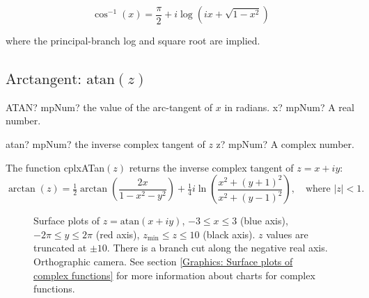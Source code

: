 \begin{equation}
	\cos^{-1}(x) = \frac{\pi}{2}+i \log \left(ix + \sqrt{1-x^2} \right) 
\end{equation}

where the principal-branch log and square root are implied.



\newpage
\subsection{\texorpdfstring{$\text{Arctangent: atan}(z)$}{atan}}
\label{inverse complex tangent}

\begin{mpFunctionsExtract}
	\mpWorksheetFunctionOneNotImplemented
	{ATAN? mpNum? the value of the arc-tangent of $x$ in radians.}
	{x? mpNum? A real number.}
\end{mpFunctionsExtract}

\vspace{0.6cm}


\begin{mpFunctionsExtract}
	\mpFunctionOne
	{atan? mpNum? the inverse complex tangent of $z$}
	{z? mpNum? A complex number.}
\end{mpFunctionsExtract}

\vspace{0.3cm}
The function \textsf{cplxATan$(z)$} returns the inverse complex tangent of $z=x+iy$: 
\begin{equation}
	\arctan(z) = \tfrac{1}{2}\arctan \left(\frac{2x}{1-x^2-y^2}\right) + \tfrac{1}{4} i \ln \left(\frac{x^2+(y+1)^2}{x^2+(y-1)^2}\right), \quad \text{where } |z|<1.
\end{equation}




\begin{figure}[ht]%
	\centering
	\qquad
	\caption[Complex Arctangent]{Surface plots of $z = \text{atan}(x + iy)$, $-3 \leq x \leq 3$ (blue axis), $-2 \pi \leq y \leq 2\pi$ (red axis), $z_{\text{min}} \leq z \leq 10$ (black axis). $z$ values are truncated at $\pm 10$. There is a branch cut along the negative real axis. Orthographic camera. See section \ref{Graphics: Surface plots of complex functions} for more information about charts for complex functions.} 
	\label{fig:Complex Arctangent}%
\end{figure}


